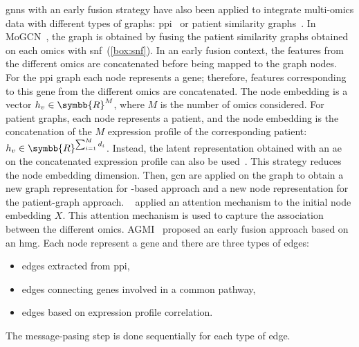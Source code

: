 \documentclass[../main.tex]{subfiles}
\begin{document}
	    \Glspl{gnn} with an early fusion strategy have also been applied to integrate multi-omics data with different types of graphs: \gls{ppi}~\cite{Althubaiti_2021,Guo2023} or patient similarity graphs~\cite{MoGCN}.
	    In MoGCN~\cite{MoGCN}, the graph is obtained by fusing the patient similarity graphs obtained on each omics with \gls{snf}~(\cref{box:snf}).
	    In an early fusion context, the features from the different omics are concatenated before being mapped to the graph nodes.
	    For the \gls{ppi} graph each node represents a gene; therefore, features corresponding to this gene from the different omics are concatenated.
	    The node embedding is a vector \(h_{v} \in \symbb{R}^{M}\), where \(M\) is the number of omics considered.
	    For patient graphs, each node represents a patient, and the node embedding is the concatenation of the \(M\) expression profile of the corresponding patient: \(h_{v} \in \symbb{R}^{\sum_{i=1}^{M}d_i}\).
	    Instead, the latent representation obtained with an \gls{ae} on the concatenated expression profile can also be used~\cite{MoGCN}.
	    This strategy reduces the node embedding dimension.
	    Then, \gls{gcn} are applied on the graph to obtain a new graph representation for -based approach and a new node representation for the patient-graph approach.
	    \citeauthor{Guo2023}~\cite{Guo2023} applied an attention mechanism to the initial node embedding \(X\).
	    This attention mechanism is used to capture the association between the different omics.
	    AGMI~\cite{AGMI} proposed an early fusion approach based on an \gls{hmg}.
	    Each node represent a gene and there are three types of edges:
	    \begin{itemize}[nosep]
	        \item edges extracted from \gls{ppi},
	        \item edges connecting genes involved in a common pathway,
	        \item edges based on expression profile correlation.
	    \end{itemize}
	    The message-pasing step is done sequentially for each type of edge.
\end{document}
